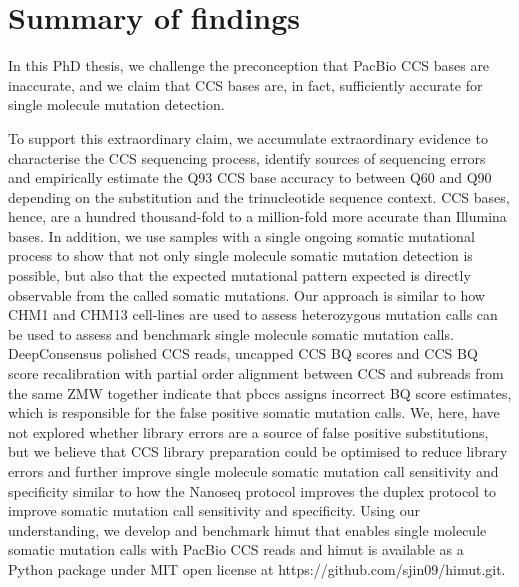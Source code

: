 \section{Summary of findings}

In this PhD thesis, we challenge the preconception that PacBio CCS bases are inaccurate, and we claim that CCS bases are, in fact, sufficiently accurate for single molecule mutation detection. 

To support this extraordinary claim, we accumulate extraordinary evidence to characterise the CCS sequencing process, identify sources of sequencing errors and empirically estimate the Q93 CCS base accuracy to between Q60 and Q90 depending on the substitution and the trinucleotide sequence context. CCS bases, hence, are a hundred thousand-fold to a million-fold more accurate than Illumina bases. In addition, we use samples with a single ongoing somatic mutational process to show that not only single molecule somatic mutation detection is possible, but also that the expected mutational pattern expected is directly observable from the called somatic mutations. Our approach is similar to how CHM1 and CHM13 cell-lines are used to assess heterozygous mutation calls can be used to assess and benchmark single molecule somatic mutation calls. DeepConsensus polished CCS reads, uncapped CCS BQ scores and CCS BQ score recalibration with partial order alignment between CCS and subreads from the same ZMW together indicate that pbccs assigns incorrect BQ score estimates, which is responsible for the false positive somatic mutation calls. We, here, have not explored whether library errors are a source of false positive substitutions, but we believe that CCS library preparation could be optimised to reduce library errors and further improve single molecule somatic mutation call sensitivity and specificity similar to how the Nanoseq protocol improves the duplex protocol to improve somatic mutation call sensitivity and specificity. Using our understanding, we develop and benchmark himut that enables single molecule somatic mutation calls with PacBio CCS reads and himut is available as a Python package under MIT open license at https://github.com/sjin09/himut.git.

